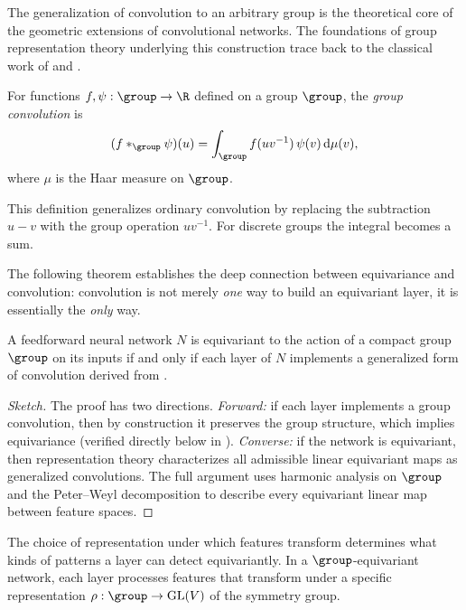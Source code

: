 The generalization of convolution to an arbitrary group is the theoretical core
of the geometric extensions of convolutional networks. The foundations of group
representation theory underlying this construction trace back to the classical
work of \citet{Peter1927} and \citet{Serre1977}.

\begin{definition}
\label{def:groups:group-convolution}
For functions $f, \psi: \group \to \R$ defined on a group $\group$, the
\emph{group convolution} is
\begin{equation}
  (f *_{\group} \psi)(u)
  = \int_{\group} f(uv^{-1})\,\psi(v)\,\Haar(v),
  \label{eq:groups:group-convolution}
\end{equation}
where $\mu$ is the Haar measure on $\group$.
\end{definition}

This definition generalizes ordinary convolution by replacing the subtraction
$u - v$ with the group operation $uv^{-1}$. For discrete groups the integral
becomes a sum.

The following theorem establishes the deep connection between equivariance and
convolution: convolution is not merely \emph{one} way to build an equivariant
layer, it is essentially the \emph{only} way.

\begin{theorem}
\label{thm:groups:kondor-trivedi}
A feedforward neural network $N$ is equivariant to the action of a compact group
$\group$ on its inputs if and only if each layer of $N$ implements a generalized
form of convolution derived from 
\citep{kondor2018generalizationconvolutionalneural}.
\end{theorem}

\begin{proof}[Sketch]
The proof has two directions. \emph{Forward:} if each layer implements a group
convolution, then by construction it preserves the group structure, which
implies equivariance (verified directly below in
).
\emph{Converse:} if the network is equivariant, then representation theory
characterizes all admissible linear equivariant maps as generalized
convolutions. The full argument uses harmonic analysis on $\group$ and the
Peter--Weyl decomposition to describe every equivariant linear map between
feature spaces.
\end{proof}

The choice of representation under which features transform determines what
kinds of patterns a layer can detect equivariantly. In a $\group$-equivariant
network, each layer processes features that transform under a specific
representation $\rho: \group \to \GL(V)$ of the symmetry group.


